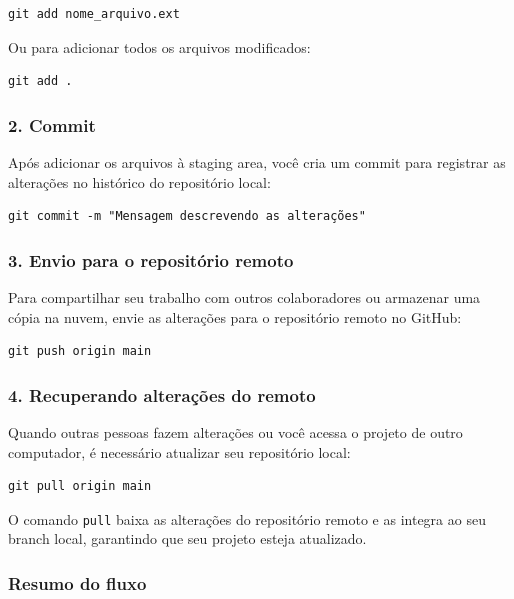 \begin{lstlisting}[style=shellstyle]
git add nome_arquivo.ext
\end{lstlisting}

Ou para adicionar todos os arquivos modificados:

\begin{lstlisting}[style=shellstyle]
git add .
\end{lstlisting}

\subsubsection*{2. Commit}

Após adicionar os arquivos à staging area, você cria um commit para registrar as alterações no histórico do repositório local:

\begin{lstlisting}[style=shellstyle]
git commit -m "Mensagem descrevendo as alterações"
\end{lstlisting}

\subsubsection*{3. Envio para o repositório remoto}

Para compartilhar seu trabalho com outros colaboradores ou armazenar uma cópia na nuvem, envie as alterações para o repositório remoto no GitHub:

\begin{lstlisting}[style=shellstyle]
git push origin main
\end{lstlisting}

\subsubsection*{4. Recuperando alterações do remoto}

Quando outras pessoas fazem alterações ou você acessa o projeto de outro computador, é necessário atualizar seu repositório local:

\begin{lstlisting}[style=shellstyle]
git pull origin main
\end{lstlisting}

O comando \texttt{pull} baixa as alterações do repositório remoto e as integra ao seu branch local, garantindo que seu projeto esteja atualizado.

\subsubsection*{Resumo do fluxo}

